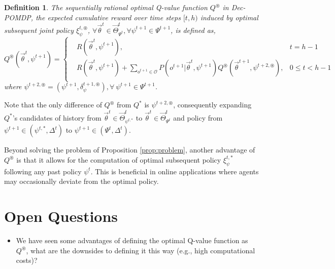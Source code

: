 \documentclass{article} %
\newcommand{\obshist}{\vec{\theta}}
\newtheorem{definition}{Definition}
\begin{document}
\begin{definition}
    The sequentially rational optimal Q-value function $Q^\circledast$ in Dec-POMDP, the expected cumulative reward over time steps $[t,h)$ induced by optimal subsequent joint policy $\xi^{t, \circledast}_\psi$, $\forall \obshist^t\in \vec{\Theta}^t_{\Psi^{t}}, \forall\psi^{t+1}\in\Psi^{t+1}$, is defined as,
    \begin{equation}
        Q^\circledast(\obshist^t, \psi^{t+1}) = \left\{
        \begin{aligned}
        &R(\obshist^t, \psi^{t+1}), &t=h-1\\ 
        &R(\obshist^t, \psi^{t+1}) + \sum_{o^{t+1} \in \mathcal{O}} P(o^{t+1}|\obshist^t, \psi^{t+1}) Q^\circledast(\obshist^{t+1}, \psi^{t+2, \circledast}), &0\leqslant t < h-1 \\
        \end{aligned}
        \right .\label{eq:SR-Q}
    \end{equation}
    where $\psi^{t+2, \circledast}=(\psi^{t+1}, \delta^{t+1, \circledast}_{\psi}), \forall \ \psi^{t+1} \in \Psi^{t+1}$.
\end{definition}

Note that the only difference of $Q^\circledast$ from $Q^*$ is $\psi^{t+2, \circledast}$, consequently expanding $Q^*$'s candidates of history from $\obshist^t \in \vec{\Theta}^t_{\psi^{t, *}}$ to $\obshist^t \in \vec{\Theta}^t_{\Psi^{t}}$ and policy from $\psi^{t+1}\in(\psi^{t, *},\Delta^t)$ to $\psi^{t+1}\in(\Psi^t,\Delta^t)$.

Beyond solving the problem of Proposition \ref{prop:problem}, another advantage of $Q^\circledast$ is that it allows for the computation of optimal subsequent policy $\xi^{t, *}_\psi$ following any past policy $\psi^{t}$. This is beneficial in online applications where agents may occasionally deviate from the optimal policy.

\section{Open Questions}

\begin{itemize}
    \item We have seen some advantages of defining the optimal Q-value function as $Q^\circledast$, what are the downsides to defining it this way (e.g., high computational costs)?
\end{itemize}




\clearpage
\appendix
\end{document}
